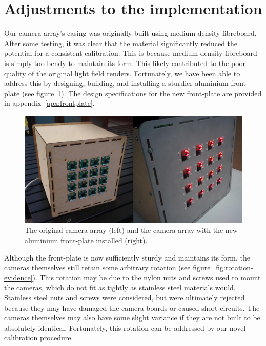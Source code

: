 \documentclass[../main.tex]{subfiles}
\begin{document}
\section{Adjustments to the implementation} \label{sec:front-plate-replacement}
Our camera array's casing was originally built using medium-density fibreboard. After some testing, it was clear that the material significantly reduced the potential for a consistent calibration. This is because medium-density fibreboard is simply too bendy to maintain its form. This likely contributed to the poor quality of the original light field renders. Fortunately, we have been able to address this by designing, building, and installing a sturdier aluminium front-plate (see figure~\ref{fig:picam-comparison}). The design specifications for the new front-plate are provided in appendix~\ref{apx:frontplate}. 

\begin{figure}[H]
    \centering
    \includegraphics[width=\linewidth]{images/picam-comparison}
    \caption{The original camera array (left) and the camera array with the new aluminium front-plate installed (right).}
    \label{fig:picam-comparison}
\end{figure}

Although the front-plate is now sufficiently sturdy and maintains its form, the cameras themselves still retain some arbitrary rotation (see figure~\ref{fig:rotation-evidence}). This rotation may be due to the nylon nuts and screws used to mount the cameras, which do not fit as tightly as stainless steel materials would. Stainless steel nuts and screws were considered, but were ultimately rejected because they may have damaged the camera boards or caused short-circuits. The cameras themselves may also have some slight variance if they are not built to be absolutely identical. Fortunately, this rotation can be addressed by our novel calibration procedure. 
\end{document}
